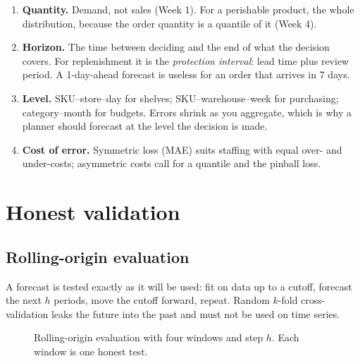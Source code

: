 \begin{enumerate}[nosep]
\item \textbf{Quantity.} Demand, not sales (Week 1). For a perishable product, the whole distribution, because the
order quantity is a quantile of it (Week 4).
\item \textbf{Horizon.} The time between deciding and the end of what the decision covers. For replenishment it is the
\emph{protection interval}: lead time plus review period. A 1-day-ahead forecast is useless for an order that
arrives in 7 days.
\item \textbf{Level.} SKU--store--day for shelves; SKU--warehouse--week for purchasing; category--month for budgets.
Errors shrink as you aggregate, which is why a planner should forecast at the level the decision is made.
\item \textbf{Cost of error.} Symmetric loss (MAE) suits staffing with equal over- and under-costs; asymmetric costs
call for a quantile and the pinball loss.
\end{enumerate}

\section{Honest validation}
\subsection{Rolling-origin evaluation}
A forecast is tested exactly as it will be used: fit on data up to a cutoff, forecast the next $h$ periods, move the
cutoff forward, repeat. Random $k$-fold cross-validation leaks the future into the past and must not be used on time
series.

\begin{figure}[H]
\centering
{}
\caption{Rolling-origin evaluation with four windows and step $h$. Each window is one honest test.}
\end{figure}


